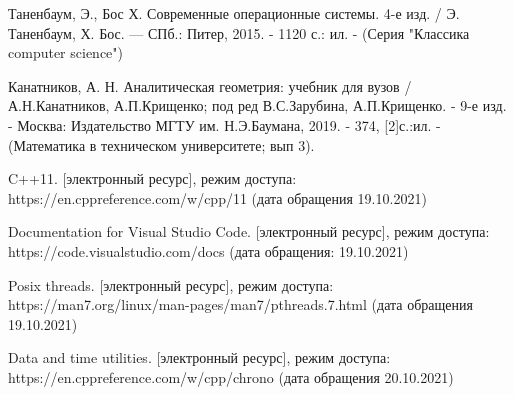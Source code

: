 \renewcommand\bibname{Список литературы}
\begin{thebibliography}{3}
	Таненбаум, Э., Бос Х. Современные операционные системы. 4-е изд. / Э. Таненбаум, Х. Бос. — СПб.: Питер, 2015. - 1120 с.: ил. - (Серия "Классика computer science")
	
	Канатников, А. Н. Аналитическая геометрия: учебник для вузов / А.Н.Канатников, А.П.Крищенко; под ред В.С.Зарубина, А.П.Крищенко. - 9-е изд. - Москва: Издательство МГТУ им. Н.Э.Баумана, 2019. - 374, [2]с.:ил. - (Математика в техническом университете; вып 3).
	
	C++11. [электронный ресурс], режим доступа: https://en.cppreference.com/w/cpp/11 (дата обращения 19.10.2021)
	
	Documentation for Visual Studio Code. [электронный ресурс], режим доступа: https://code.visualstudio.com/docs (дата обращения: 19.10.2021)

	Posix threads. [электронный ресурс], режим доступа: https://man7.org/linux/man-pages/man7/pthreads.7.html (дата обращения 19.10.2021)
	
	Data and time utilities. [электронный ресурс], режим доступа: https://en.cppreference.com/w/cpp/chrono (дата обращения 20.10.2021)

	
\end{thebibliography}